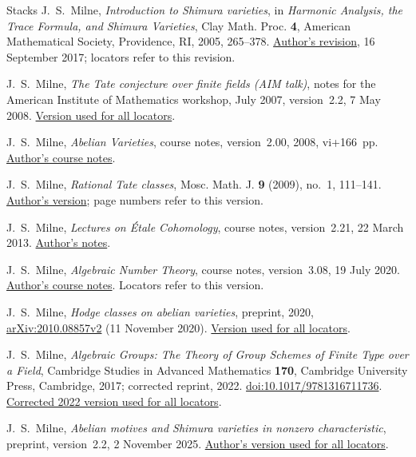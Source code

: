 \begin{thebibliography}{Stacks}
J.~S.~Milne,
\emph{Introduction to Shimura varieties},
in \emph{Harmonic Analysis, the Trace Formula, and Shimura Varieties},
Clay Math. Proc. \textbf{4}, American Mathematical Society,
Providence, RI, 2005, 265--378.
\href{https://www.jmilne.org/math/xnotes/svi.pdf}{Author's revision},
16 September 2017; locators refer to this revision.

J.~S.~Milne,
\emph{The Tate conjecture over finite fields (AIM talk)},
notes for the American Institute of Mathematics workshop, July 2007,
version~2.2, 7 May 2008.
\href{https://www.jmilne.org/math/articles/2007e.pdf}{Version used for all locators}.

J.~S.~Milne,
\emph{Abelian Varieties}, course notes, version~2.00, 2008, vi+166~pp.
\href{https://www.jmilne.org/math/CourseNotes/AVc.pdf}{Author's course notes}.

J.~S.~Milne,
\emph{Rational Tate classes},
Mosc. Math. J. \textbf{9} (2009), no.~1, 111--141.
\href{https://www.jmilne.org/math/articles/2009b.pdf}{Author's version};
page numbers refer to this version.

J.~S.~Milne,
\emph{Lectures on \'{E}tale Cohomology},
course notes, version~2.21, 22 March 2013.
\href{https://www.jmilne.org/math/CourseNotes/LEC.pdf}{Author's notes}.

J.~S.~Milne,
\emph{Algebraic Number Theory}, course notes, version~3.08, 19 July 2020.
\href{https://www.jmilne.org/math/CourseNotes/ANTc.pdf}{Author's course notes}.
Locators refer to this version.

J.~S.~Milne,
\emph{Hodge classes on abelian varieties},
preprint, 2020,
\href{https://arxiv.org/abs/2010.08857v2}{arXiv:2010.08857v2}
(11 November 2020).
\href{https://arxiv.org/pdf/2010.08857v2}{Version used for all locators}.

J.~S.~Milne,
\emph{Algebraic Groups: The Theory of Group Schemes of Finite Type over a Field},
Cambridge Studies in Advanced Mathematics \textbf{170},
Cambridge University Press, Cambridge, 2017; corrected reprint, 2022.
\href{https://doi.org/10.1017/9781316711736}{doi:10.1017/9781316711736}.
\href{https://www.jmilne.org/math/Books/iAG2022.pdf}{Corrected 2022 version used for all locators}.

J.~S.~Milne,
\emph{Abelian motives and Shimura varieties in nonzero characteristic},
preprint, version~2.2, 2 November 2025.
\href{https://www.jmilne.org/math/articles/SVp.pdf}{Author's version used for all locators}.


\end{thebibliography}
